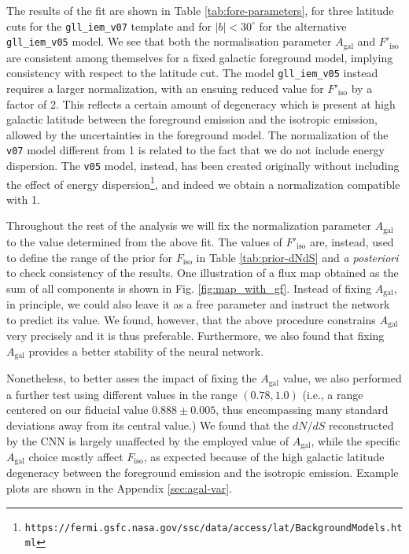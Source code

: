 \documentclass[a4paper,11pt]{article}
\newcommand{\dnds}{dN/dS }
\begin{document}
The results of the fit are shown in Table \ref{tab:fore-parameters}, for three latitude cuts for the \verb|gll_iem_v07| template and for $|b|<30^\circ$ for the alternative \verb|gll_iem_v05| model. We see that both the normalisation parameter $A_\textrm{gal}$ and $F'_\textrm{iso}$ are consistent among themselves for a fixed galactic foreground model, implying consistency with respect to the latitude cut. The model \verb|gll_iem_v05| instead requires a larger normalization, with an ensuing reduced value for $F'_\textrm{iso}$ by a factor of 2.
This reflects a certain amount of degeneracy which is present at high galactic latitude between the foreground emission and the isotropic emission, allowed by the uncertainties in the foreground model.
The normalization of the \verb|v07| model different from 1 is related to the fact that we do not include energy dispersion. The \verb|v05| model, instead, has been created originally without including the effect of energy dispersion\footnote{\verb|https://fermi.gsfc.nasa.gov/ssc/data/access/lat/BackgroundModels.html|}, and indeed we obtain a normalization compatible with 1.


Throughout the rest of the analysis we will fix the normalization parameter $A_\textrm{gal}$ to the value determined from the above fit. The values of $F'_\textrm{iso}$ are, instead, used to define the range of the prior for $F_\textrm{iso}$ in Table \ref{tab:prior-dNdS} and \textsl{a posteriori} to check consistency of the results.
%
One illustration of a flux map obtained as the sum of all components is shown in Fig. \ref{fig:map_with_gf}.
Instead of fixing $A_\textrm{gal}$, in principle, we could also leave it as a free parameter and instruct the network to predict its value. We found, however, that the above procedure constrains $A_\textrm{gal}$ very precisely and it is thus preferable. Furthermore, we also found that fixing $A_\textrm{gal}$ provides a better stability of the neural network.  

{  Nonetheless, to better asses the impact of fixing the $A_\textrm{gal}$ value, we also performed a further test using different values in the range $(0.78, 1.0)$ (i.e., a range centered on our fiducial value $0.888 \pm 0.005$, thus encompassing many standard deviations away from its central value.)
We found that the $\dnds$ reconstructed by the CNN is largely unaffected by the employed value of $A_\textrm{gal}$, while 
the specific $A_\textrm{gal}$ choice mostly affect $F_\textrm{iso}$,
as expected because of the  high galactic latitude degeneracy between the foreground emission and the isotropic emission. 
Example plots are shown in the Appendix \ref{sec:agal-var}.}
\end{document}
